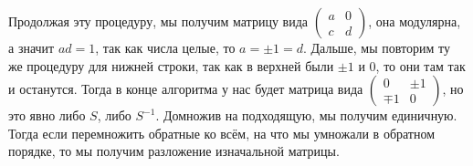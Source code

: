 \documentclass{article}
\begin{document}
\begin{enumerate}
        Продолжая эту процедуру, мы получим матрицу вида $\left(\begin{array}{cc}
        a&  0\\c & d\end{array}\right)$, она модулярна, а значит $ad=1$, так как
        числа целые, то $a=\pm1=d$. Дальше, мы повторим ту же процедуру для
        нижней строки, так как в верхней были $\pm1$ и $0$, то они там так и
        останутся. Тогда в конце алгоритма у нас будет матрица вида $\left(
        \begin{array}{cc}0 & \pm1\\\mp1 & 0\end{array}\right)$, но это явно
        либо $S$, либо $S^{-1}$. Домножив на подходящую, мы получим единичную.
        Тогда если перемножить обратные ко всём, на что мы умножали в обратном
        порядке, то мы получим разложение изначальной матрицы.
\end{enumerate}
\end{document}
